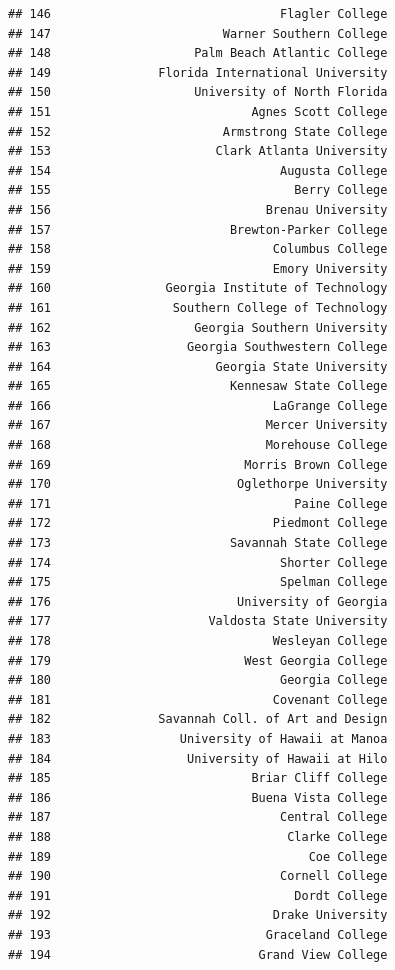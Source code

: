 \documentclass[]{article}
\begin{document}
\begin{verbatim}
## 146                                Flagler College
## 147                        Warner Southern College
## 148                    Palm Beach Atlantic College
## 149               Florida International University
## 150                    University of North Florida
## 151                            Agnes Scott College
## 152                        Armstrong State College
## 153                       Clark Atlanta University
## 154                                Augusta College
## 155                                  Berry College
## 156                              Brenau University
## 157                         Brewton-Parker College
## 158                               Columbus College
## 159                               Emory University
## 160                Georgia Institute of Technology
## 161                 Southern College of Technology
## 162                    Georgia Southern University
## 163                   Georgia Southwestern College
## 164                       Georgia State University
## 165                         Kennesaw State College
## 166                               LaGrange College
## 167                              Mercer University
## 168                              Morehouse College
## 169                           Morris Brown College
## 170                          Oglethorpe University
## 171                                  Paine College
## 172                               Piedmont College
## 173                         Savannah State College
## 174                                Shorter College
## 175                                Spelman College
## 176                          University of Georgia
## 177                      Valdosta State University
## 178                               Wesleyan College
## 179                           West Georgia College
## 180                                Georgia College
## 181                               Covenant College
## 182               Savannah Coll. of Art and Design
## 183                  University of Hawaii at Manoa
## 184                   University of Hawaii at Hilo
## 185                            Briar Cliff College
## 186                            Buena Vista College
## 187                                Central College
## 188                                 Clarke College
## 189                                    Coe College
## 190                                Cornell College
## 191                                  Dordt College
## 192                               Drake University
## 193                              Graceland College
## 194                             Grand View College

\end{verbatim}
\end{document}
